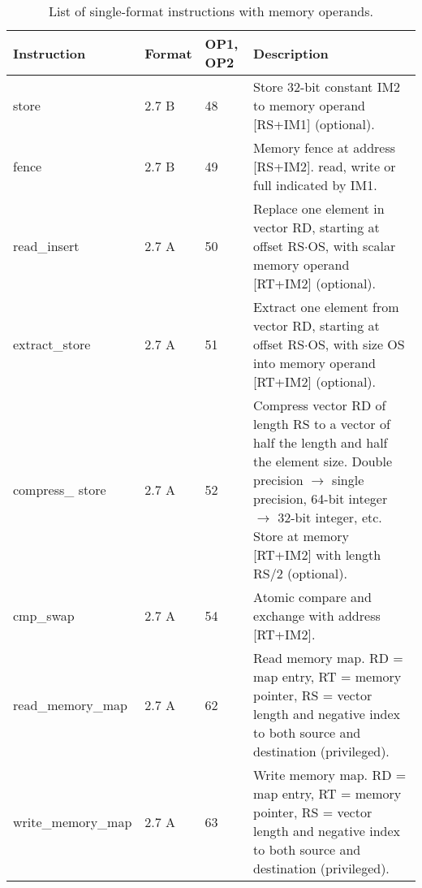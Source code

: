 \documentclass[forwardcom.tex]{subfiles}
\begin{document}
\begin{longtable} {|p{20mm}|p{10mm}|p{8mm}|p{75mm}|}
\caption{List of single-format instructions with memory operands.} 
\label{table:ListOfSingleFormatInstructionsMemory} \\
\endfirsthead
\endhead
\hline
\bfseries Instruction & \bfseries Format &\bfseries OP1, OP2 & \bfseries Description \\
\hline
store         & 2.7 B & 48 & Store 32-bit constant IM2 to memory operand [RS+IM1] (optional). \\

fence         & 2.7 B & 49 & Memory fence at address [RS+IM2]. read, write or full indicated by IM1.\\

read\_insert  & 2.7 A & 50 & Replace one element in vector RD, starting at offset 
RS$\cdot$OS, with scalar memory operand [RT+IM2] (optional).  \\

extract\_store& 2.7 A & 51 & Extract one element from vector RD, starting at offset RS$\cdot$OS, with size OS into memory operand [RT+IM2] (optional). \\

compress\_ store& 2.7 A & 52 & Compress vector RD of length RS to a vector of half the length and half the element size. Double precision $\rightarrow$ single precision, 64-bit integer $\rightarrow$ 32-bit integer, etc. Store at memory [RT+IM2] with length RS/2 (optional).\\

cmp\_swap     & 2.7 A & 54 & Atomic compare and exchange with address [RT+IM2].\\

read\_memory\_\newline map  & 2.7 A & 62 & Read memory map. RD = map entry, RT = memory pointer, RS = vector length and negative index to both source and destination (privileged). \\
write\_memory\_\newline map & 2.7 A & 63 & Write memory map. RD = map entry, RT = memory pointer, RS = vector length and negative index to both source and destination (privileged). \\

\hline
\end{longtable}
\end{document}
